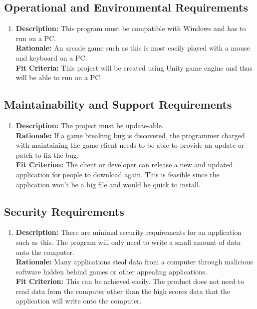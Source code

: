 \documentclass[12pt, titlepage]{article}
\begin{document}
\subsection{Operational and Environmental Requirements}
\begin{enumerate}[label=OR\arabic*]
\item \textbf{Description:} This program must be compatible with Windows and has to run on a PC.\\
\textbf{Rationale:} An arcade game such as this is most easily played with a mouse and keyboard on a PC.\\
\textbf{Fit Criteria:} This project will be created using Unity game engine and thus will be able to run on a PC.

\end{enumerate}


\subsection{Maintainability and Support Requirements}
\begin{enumerate}[label=M\arabic*]
\item \textbf{Description:} The project must be update-able.\\
\textbf{Rationale:} If a game breaking bug is discovered, the {\color{blue}programmer charged with maintaining the game} \sout{client} needs to be able to provide an update or patch to fix the bug. \\
\textbf{Fit Criterion:} The client or developer can release a new and updated application for people to download again. This is feasible since the application won't be a big file and would be quick to install.

\end{enumerate}



\subsection{Security Requirements}
\begin{enumerate}[label=S\arabic*]
\item \textbf{Description:} There are minimal security requirements for an application such as this. The program will only need to write a small amount of data onto the computer.\\
\textbf{Rationale:} Many applications steal data from a computer through malicious software hidden behind games or other appealing applications.\\
\textbf{Fit Criterion:} This can be achieved easily. The product does not need to read data from the computer other than the high scores data that the application will write onto the computer.

\end{enumerate}
\end{document}
